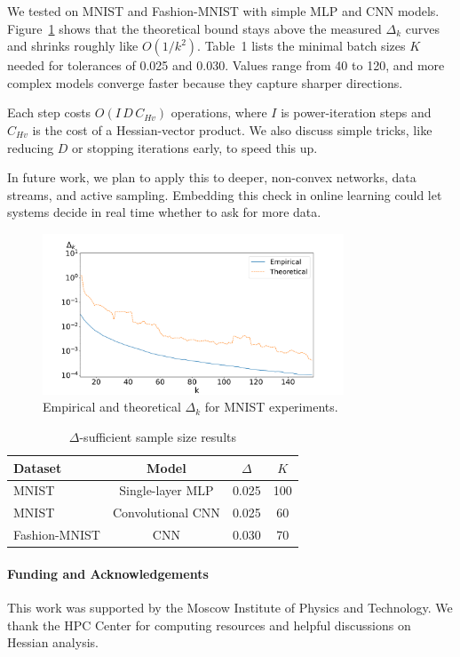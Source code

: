 \documentclass[a4paper,12pt]{article}
\begin{document}
We tested on MNIST and Fashion-MNIST with simple MLP and CNN models. Figure~\ref{fig:delta} shows that the 
theoretical bound stays above the measured $\Delta_k$ curves and shrinks roughly like $O(1/k^2)$. Table~1 lists the minimal batch sizes $K$ needed for tolerances of 0.025 and 0.030. Values range from 40 to 120, and more complex models converge faster because they capture sharper directions.

Each step costs $O(I\,D\,C_{Hv})$ operations, where $I$ is power-iteration steps and $C_{Hv}$ is the cost of a Hessian-vector product. We also discuss simple tricks, like reducing $D$ or stopping iterations early, to speed this up.

In future work, we plan to apply this to deeper, non-convex networks, data streams, and active sampling. Embedding this check in online learning could let systems decide in real time whether to ask for more data.

\begin{figure}[ht]
  \centering
  \includegraphics[width=0.8\textwidth]{img/delta_border_1_10_1024.pdf}
  \caption{Empirical and theoretical $\Delta_k$ for MNIST experiments.}
  \label{fig:delta}
\end{figure}

\begin{table}[ht]
  \centering
  \caption{$\Delta$-sufficient sample size results}
  \begin{tabular}{lccc}
    \hline
    Dataset & Model & $\Delta$ & $K$ \\
    \hline
    MNIST & Single-layer MLP & 0.025 & 100 \\
    MNIST & Convolutional CNN & 0.025 & 60 \\
    Fashion-MNIST & CNN & 0.030 & 70 \\
    \hline
  \end{tabular}
\end{table}

\paragraph{Funding and Acknowledgements}
This work was supported by the Moscow Institute of Physics and Technology. We thank the HPC Center for computing resources and helpful discussions on Hessian analysis.
\end{document}
